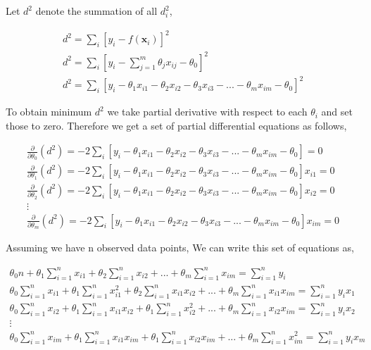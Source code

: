 \documentclass[english]{tktltiki}
\begin{document}
Let $d^2$ denote the summation of all $d^2_i$,

\begin{eqnarray}
d^2 = \sum_i[y_i - f(\mathbf{x}_i)]^2 \nonumber\\
d^2 = \sum_i[y_i - \sum_{j=1}^m \theta_j x_{ij} - \theta_0]^2 \nonumber\\
d^2 = \sum_i[y_i - \theta_1x_{i1} - \theta_2x_{i2} - \theta_3x_{i3} - ... - \theta_mx_{im} - \theta_0]^2
\end{eqnarray}

To obtain minimum $d^2$ we take partial derivative with respect to each $\theta_i$ and set those to zero. Therefore we get a set of partial differential equations as follows,

\begin{eqnarray}
\frac{\partial}{\partial{\theta_0}}(d^2) = -2\sum_i[y_i - \theta_1x_{i1} - \theta_2x_{i2} - \theta_3x_{i3} - ... - \theta_mx_{im} - \theta_0] = 0\nonumber \\
\frac{\partial}{\partial{\theta_1}}(d^2) = -2\sum_i[y_i - \theta_1x_{i1} - \theta_2x_{i2} - \theta_3x_{i3} - ... - \theta_mx_{im} - \theta_0]x_{i1} = 0\nonumber \\
\frac{\partial}{\partial{\theta_2}}(d^2) = -2\sum_i[y_i - \theta_1x_{i1} - \theta_2x_{i2} - \theta_3x_{i3} - ... - \theta_mx_{im} - \theta_0]x_{i2} = 0\nonumber \\
\vdots \nonumber \\
\frac{\partial}{\partial{\theta_m}}(d^2) = -2\sum_i[y_i - \theta_1x_{i1} - \theta_2x_{i2} - \theta_3x_{i3} - ... - \theta_mx_{im} - \theta_0]x_{im} = 0
\end{eqnarray}

Assuming we have n observed data points, We can write this set of equations as,

\begin{eqnarray}
\theta_0 n + \theta_1 \sum_{i=1}^n x_{i1} + \theta_2 \sum_{i=1}^n x_{i2} + ... + \theta_m \sum_{i=1}^n x_{im} = \sum_{i=1}^n y_i \nonumber \\
\theta_0 \sum_{i=1}^n x_{i1} + \theta_1 \sum_{i=1}^n x_{i1}^2 + \theta_2 \sum_{i=1}^n x_{i1} x_{i2} +  ... + \theta_m \sum_{i=1}^n x_{i1} x_{im} = \sum_{i=1}^n y_i x_1 \nonumber \\
\theta_0 \sum_{i=1}^n x_{i2} + \theta_1 \sum_{i=1}^n x_{i1} x_{i2} + \theta_1 \sum_{i=1}^n x_{i2}^2 + ... + \theta_m \sum_{i=1}^n x_{i2} x_{im} = \sum_{i=1}^n y_i x_2 \nonumber \\
\vdots \nonumber \\
\theta_0 \sum_{i=1}^n x_{im} + \theta_1 \sum_{i=1}^n x_{i1} x_{im} + \theta_1 \sum_{i=1}^n x_{i2} x_{im} + ... + \theta_m \sum_{i=1}^n x_{im}^2 = \sum_{i=1}^n y_i x_m
\end{eqnarray}
\end{document}
